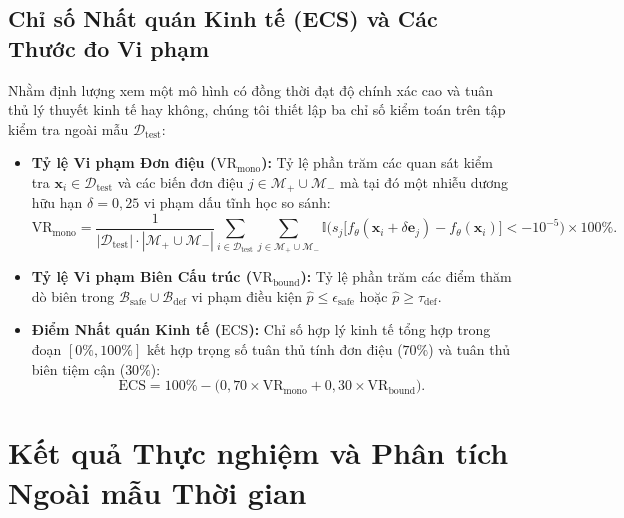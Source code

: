 \documentclass[11pt,a4paper]{article}
\begin{document}
\subsection{Chỉ số Nhất quán Kinh tế (ECS) và Các Thước đo Vi phạm}
Nhằm định lượng xem một mô hình có đồng thời đạt độ chính xác cao và tuân thủ lý thuyết kinh tế hay không, chúng tôi thiết lập ba chỉ số kiểm toán trên tập kiểm tra ngoài mẫu $\mathcal{D}_{\text{test}}$:
\begin{itemize}
    \item \textbf{Tỷ lệ Vi phạm Đơn điệu ($\text{VR}_{\text{mono}}$):} Tỷ lệ phần trăm các quan sát kiểm tra $\mathbf{x}_i \in \mathcal{D}_{\text{test}}$ và các biến đơn điệu $j \in \mathcal{M}_+ \cup \mathcal{M}_-$ mà tại đó một nhiễu dương hữu hạn $\delta = 0,25$ vi phạm dấu tĩnh học so sánh:
    \begin{equation}
        \text{VR}_{\text{mono}} = \frac{1}{|\mathcal{D}_{\text{test}}| \cdot |\mathcal{M}_+ \cup \mathcal{M}_-|} \sum_{i \in \mathcal{D}_{\text{test}}} \sum_{j \in \mathcal{M}_+ \cup \mathcal{M}_-} \mathbb{I}\Big( s_j \big[f_\theta(\mathbf{x}_i + \delta \mathbf{e}_j) - f_\theta(\mathbf{x}_i)\big] < -10^{-5} \Big) \times 100\%.
    \end{equation}
    \item \textbf{Tỷ lệ Vi phạm Biên Cấu trúc ($\text{VR}_{\text{bound}}$):} Tỷ lệ phần trăm các điểm thăm dò biên trong $\mathcal{B}_{\text{safe}} \cup \mathcal{B}_{\text{def}}$ vi phạm điều kiện $\hat{p} \le \epsilon_{\text{safe}}$ hoặc $\hat{p} \ge \tau_{\text{def}}$.
    \item \textbf{Điểm Nhất quán Kinh tế ($\text{ECS}$):} Chỉ số hợp lý kinh tế tổng hợp trong đoạn $[0\%, 100\%]$ kết hợp trọng số tuân thủ tính đơn điệu ($70\%$) và tuân thủ biên tiệm cận ($30\%$):
    \begin{equation}
        \text{ECS} = 100\% - \Big( 0,70 \times \text{VR}_{\text{mono}} + 0,30 \times \text{VR}_{\text{bound}} \Big).
    \end{equation}
\end{itemize}

\section{Kết quả Thực nghiệm và Phân tích Ngoài mẫu Thời gian}
\label{sec:experiments}
\end{document}
